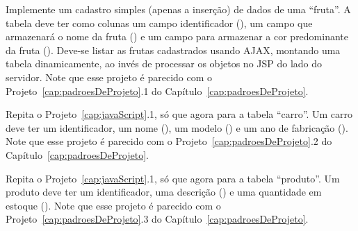 \begin{projetoSemArquivo}{}{}{}
    Implemente um cadastro simples (apenas a inserção) de dados de uma ``fruta''. A tabela deve ter como colunas um campo identificador (), um campo que armazenará o nome da fruta () e um campo para armazenar a cor predominante da fruta (). Deve-se listar as frutas cadastrados usando AJAX, montando uma tabela dinamicamente, ao invés de processar os objetos no JSP do lado do servidor. Note que esse projeto é parecido com o Projeto~\ref{cap:padroesDeProjeto}.1 do Capítulo~\ref{cap:padroesDeProjeto}.
\end{projetoSemArquivo}

\begin{projetoSemArquivo}{}{}{}
    Repita o Projeto~\ref{cap:javaScript}.1, só que agora para a tabela ``carro''. Um carro deve ter um identificador, um nome (), um modelo () e um ano de fabricação (). Note que esse projeto é parecido com o Projeto~\ref{cap:padroesDeProjeto}.2 do Capítulo~\ref{cap:padroesDeProjeto}.
\end{projetoSemArquivo}

\begin{projetoSemArquivo}{}{}{}
    Repita o Projeto~\ref{cap:javaScript}.1, só que agora para a tabela ``produto''. Um produto deve ter um identificador, uma descrição () e uma quantidade em estoque (). Note que esse projeto é parecido com o Projeto~\ref{cap:padroesDeProjeto}.3 do Capítulo~\ref{cap:padroesDeProjeto}.
\end{projetoSemArquivo}